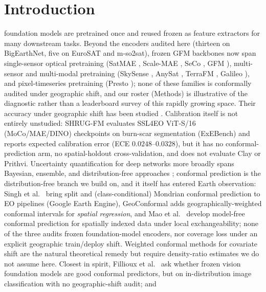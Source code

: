 \documentclass[journal]{IEEEtran}
\renewcommand{\_}{\textunderscore\allowbreak}
\begin{document}
\section{Introduction}\label{sec:intro}
 foundation models are pretrained once and reused frozen as feature extractors for many downstream
tasks. Beyond the encoders audited here (thirteen on BigEarthNet, five on EuroSAT and m-so2sat), frozen GFM
backbones now span single-sensor optical pretraining
(SatMAE \citep{cong2022satmae}, Scale-MAE \citep{reed2023scalemae}, SeCo \citep{manas2021seasonal}, GFM
\citep{mendieta2023gfm}), multi-sensor and multi-modal pretraining (SkySense
\citep{guo2024skysense}, AnySat \citep{astruc2025anysat}, TerraFM \citep{danish2025terrafm}, Galileo
\citep{tseng2025galileo}), and pixel-timeseries pretraining (Presto \citep{tseng2023presto}); none of these
families is conformally audited under geographic shift, and our roster (Methods) is illustrative
of the diagnostic rather than a leaderboard survey of this rapidly growing space. Their accuracy under geographic shift has been studied \citep{cohrs2025shrugfm,tamazyan2025geocrossbench}. Calibration itself
is not entirely unstudied: SHRUG-FM \citep{cohrs2025shrugfm} evaluates SSL4EO ViT-S/16 (MoCo/MAE/DINO) checkpoints on
burn-scar segmentation (ExEBench) and reports expected calibration error (ECE $0.0248$--$0.0328$), but it has
no conformal-prediction arm, no spatial-holdout cross-validation, and does not evaluate Clay or Prithvi.
Uncertainty quantification for deep networks more broadly spans Bayesian, ensemble, and distribution-free
approaches \citep{gawlikowski2023survey}; conformal prediction is the distribution-free branch we build on, and
it itself has entered Earth observation: Singh et al.~\citep{singh2024uncertainty} bring split and
(class-conditional) Mondrian conformal prediction to EO pipelines (Google Earth Engine), GeoConformal
\citep{lou2024geoconformal} adds geographically-weighted conformal intervals for \emph{spatial regression}, and
Mao et al.~\citep{mao2024spatial} develop model-free conformal prediction for spatially indexed data under local
exchangeability; none of the three audits frozen foundation-model encoders, nor coverage loss under an explicit geographic
train/deploy shift. Weighted conformal methods for covariate shift \citep{tibshirani2019covariate} are the natural
theoretical remedy but require density-ratio estimates we do not assume here.
Closest in spirit, Fillioux et al.~\citep{fillioux2024fmconformal} ask whether frozen vision foundation models are good
conformal predictors, but on in-distribution image classification with no geographic-shift audit; and
\end{document}
